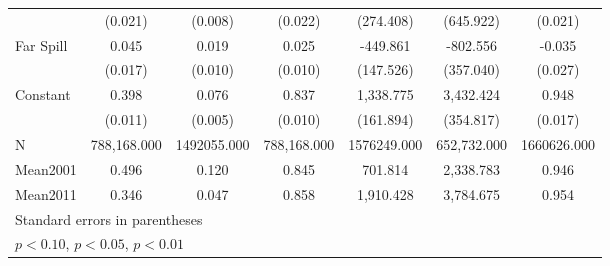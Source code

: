 {\begin{tabular}{l*{6}{c}}
                &  (0.021)         &  (0.008)         &  (0.022)         &(274.408)         &(645.922)         &  (0.021)         \\
[1em]
Far Spill       &    0.045\sym{***}&    0.019\sym{*}  &    0.025\sym{**} & -449.861\sym{***}& -802.556\sym{**} &   -0.035         \\
                &  (0.017)         &  (0.010)         &  (0.010)         &(147.526)         &(357.040)         &  (0.027)         \\
[1em]
Constant        &    0.398\sym{***}&    0.076\sym{***}&    0.837\sym{***}&1,338.775\sym{***}&3,432.424\sym{***}&    0.948\sym{***}\\
                &  (0.011)         &  (0.005)         &  (0.010)         &(161.894)         &(354.817)         &  (0.017)         \\
\hline
N               &788,168.000         &1492055.000         &788,168.000         &1576249.000         &652,732.000         &1660626.000         \\
Mean2001        &    0.496         &    0.120         &    0.845         &  701.814         &2,338.783         &    0.946         \\
Mean2011        &    0.346         &    0.047         &    0.858         &1,910.428         &3,784.675         &    0.954         \\
\hline\hline
\multicolumn{7}{l}{\footnotesize Standard errors in parentheses}\\
\multicolumn{7}{l}{\footnotesize \sym{*} \(p<0.10\), \sym{**} \(p<0.05\), \sym{***} \(p<0.01\)}\\
\end{tabular}
}
